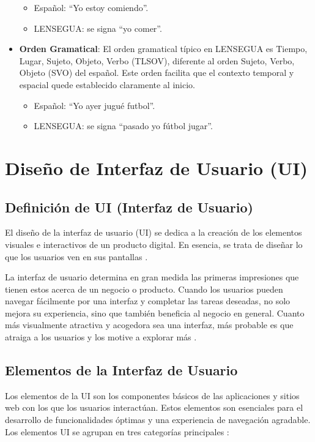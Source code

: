 \begin{itemize}
\begin{itemize}
        \item Español: ``Yo estoy comiendo”.
        \item LENSEGUA: se signa ``yo comer”.
    \end{itemize}
    \item \textbf{Orden Gramatical}: El orden gramatical típico en LENSEGUA es Tiempo, Lugar, Sujeto, Objeto, Verbo (TLSOV), diferente al orden Sujeto, Verbo, Objeto (SVO) del español. Este orden facilita que el contexto temporal y espacial quede establecido claramente al inicio.
    \begin{itemize}
        \item Español: ``Yo ayer jugué futbol”.
        \item LENSEGUA: se signa ``pasado yo fútbol jugar”.
    \end{itemize}
\end{itemize}

\section{Diseño de Interfaz de Usuario (UI)}
\subsection{Definición de UI (Interfaz de Usuario)}
El diseño de la interfaz de usuario (UI) se dedica a la creación de los elementos visuales e interactivos de un producto digital. En esencia, se trata de diseñar lo que los usuarios ven en sus pantallas \cite{OrtegaSF}.

La interfaz de usuario determina en gran medida las primeras impresiones que tienen estos acerca de un negocio o producto. Cuando los usuarios pueden navegar fácilmente por una interfaz y completar las tareas deseadas, no solo mejora su experiencia, sino que también beneficia al negocio en general. Cuanto más visualmente atractiva y acogedora sea una interfaz, más probable es que atraiga a los usuarios y los motive a explorar más \cite{OrtegaSF}.

\subsection{Elementos de la Interfaz de Usuario}
Los elementos de la UI son los componentes básicos de las aplicaciones y sitios web con los que los usuarios interactúan. Estos elementos son esenciales para el desarrollo de funcionalidades óptimas y una experiencia de navegación agradable. Los elementos UI se agrupan en tres categorías principales \cite{OrtegaSF}:

